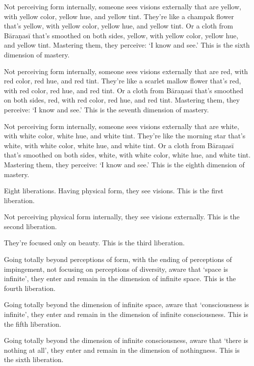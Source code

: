 \documentclass[12pt,openany]{book}%
\begin{document}
Not perceiving form internally, someone sees visions externally that are yellow, with yellow color, yellow hue, and yellow tint. They’re like a champak flower that’s yellow, with yellow color, yellow hue, and yellow tint. Or a cloth from \textsanskrit{Bāraṇasī} that’s smoothed on both sides, yellow, with yellow color, yellow hue, and yellow tint. Mastering them, they perceive: ‘I know and see.’ This is the sixth dimension of mastery. 

Not perceiving form internally, someone sees visions externally that are red, with red color, red hue, and red tint. They’re like a scarlet mallow flower that’s red, with red color, red hue, and red tint. Or a cloth from \textsanskrit{Bāraṇasī} that’s smoothed on both sides, red, with red color, red hue, and red tint. Mastering them, they perceive: ‘I know and see.’ This is the seventh dimension of mastery. 

Not perceiving form internally, someone sees visions externally that are white, with white color, white hue, and white tint. They’re like the morning star that’s white, with white color, white hue, and white tint. Or a cloth from \textsanskrit{Bāraṇasī} that’s smoothed on both sides, white, with white color, white hue, and white tint. Mastering them, they perceive: ‘I know and see.’ This is the eighth dimension of mastery. 

Eight liberations. Having physical form, they see visions. This is the first liberation. 

Not perceiving physical form internally, they see visions externally. This is the second liberation. 

They’re focused only on beauty. This is the third liberation. 

Going totally beyond perceptions of form, with the ending of perceptions of impingement, not focusing on perceptions of diversity, aware that ‘space is infinite’, they enter and remain in the dimension of infinite space. This is the fourth liberation. 

Going totally beyond the dimension of infinite space, aware that ‘consciousness is infinite’, they enter and remain in the dimension of infinite consciousness. This is the fifth liberation. 

Going totally beyond the dimension of infinite consciousness, aware that ‘there is nothing at all’, they enter and remain in the dimension of nothingness. This is the sixth liberation. 
\end{document}
